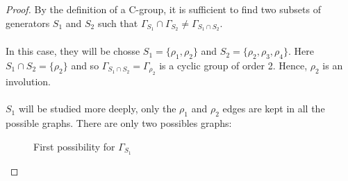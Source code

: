 \begin{proof}
  By the definition of a C-group, it is sufficient to find two subsets of generators $S_1$ and $S_2$ such that $\Gamma_{S_1} \cap \Gamma_{S_2} \neq \Gamma_{S_1 \cap S_2}$.

  \paragraph{}
  In this case, they will be chosse $S_1 = \{\rho_1, \rho_2\}$ and $S_2 = \{\rho_2, \rho_3, \rho_4\}$. Here $S_1 \cap S_2 = \{\rho_2\}$ and so $\Gamma_{S_1 \cap S_2} = \Gamma_{\rho_2}$ is a cyclic group of order 2. Hence, $\rho_2$ is an involution.

  \paragraph{}
  $S_1$ will be studied more deeply, only the $\rho_1$ and $\rho_2$ edges are kept in all the possible graphs. There are only two possibles graphs:

  \begin{figure}[H]
    \begin{center}
      \caption{First possibility for $\Gamma_{S_1}$}
    \end{center}
  \end{figure}


\end{proof}
